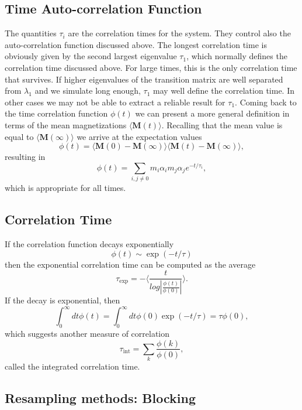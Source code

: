 \documentclass[%
oneside,                 %
final,                   %
10pt]{article}
\begin{document}
\subsection{Time Auto-correlation Function}
\begin{block}{}

The quantities $\tau_i$ are the correlation times for the system. They control also the auto-correlation function 
discussed above.  The longest correlation time is obviously given by the second largest
eigenvalue $\tau_1$, which normally defines the correlation time discussed above. For large times, this is the 
only correlation time that survives. If higher eigenvalues of the transition matrix are well separated from 
$\lambda_1$ and we simulate long enough,  $\tau_1$ may well define the correlation time. 
In other cases we may not be able to extract a reliable result for $\tau_1$. 
Coming back to the time correlation function $\phi(t)$ we can present a more general definition in terms
of the mean magnetizations $ \langle \mathbf{M}(t) \rangle$. Recalling that the mean value is equal 
to $ \langle \mathbf{M}(\infty) \rangle$ we arrive at the expectation values
\[
\phi(t) =\langle \mathbf{M}(0)-\mathbf{M}(\infty)\rangle \langle \mathbf{M}(t)-\mathbf{M}(\infty)\rangle,
\]
resulting in
\[
\phi(t) =\sum_{i,j\ne 0}m_i\alpha_im_j\alpha_je^{-t/\tau_i},
\]
which is appropriate for all times.
\end{block}

\subsection{Correlation Time}
\begin{block}{}

If the correlation function decays exponentially
\[ \phi (t) \sim \exp{(-t/\tau)}\]
then the exponential correlation time can be computed as the average
\[   \tau_{\mathrm{exp}}  =  -\langle  \frac{t}{log|\frac{\phi(t)}{\phi(0)}|} \rangle. \]
If the decay is exponential, then
\[  \int_0^{\infty} dt \phi(t)  = \int_0^{\infty} dt \phi(0)\exp{(-t/\tau)}  = \tau \phi(0),\] 
which  suggests another measure of correlation
\[   \tau_{\mathrm{int}} = \sum_k \frac{\phi(k)}{\phi(0)}, \]
called the integrated correlation time.
\end{block}

\subsection{Resampling methods: Blocking}
\end{document}
